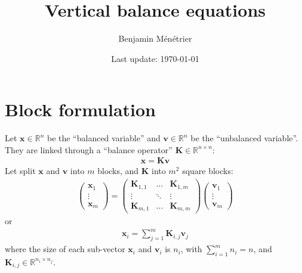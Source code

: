 \documentclass[12pt]{scrartcl}
\begin{document}
\title{Vertical balance equations}
\author{Benjamin Ménétrier}
\date{Last update: \today}

\thispagestyle{empty}

\maketitle

\tableofcontents

\clearpage

\section{Block formulation}
Let $\mathbf{x} \in \mathbb{R}^n$ be the ``balanced variable'' and $\mathbf{v} \in \mathbb{R}^n$ be the ``unbalanced variable''. They are linked through a ``balance operator'' $\mathbf{K} \in \mathbb{R}^{n \times n}$:
\begin{align}
\mathbf{x} = \mathbf{K} \mathbf{v}
\end{align}
Let split $\mathbf{x}$ and $\mathbf{v}$ into $m$ blocks, and $\mathbf{K}$ into $m^2$ square blocks:
\begin{align}
\left(\begin{array}{c}
\mathbf{x}_1 \\
\vdots \\
\mathbf{x}_m
\end{array} \right) = \left(\begin{array}{ccc}
\mathbf{K}_{1,1} & \dots & \mathbf{K}_{1,m} \\
\vdots & \ddots & \vdots \\
\mathbf{K}_{m,1} & \dots & \mathbf{K}_{m,m} 
\end{array} \right) \left(\begin{array}{c}
\mathbf{v}_1 \\
\vdots \\
\mathbf{v}_m
\end{array} \right)
\end{align}
or
\begin{align}
\label{eq:full}
\mathbf{x}_i = \sum_{j=1}^m \mathbf{K}_{i,j} \mathbf{v}_j
\end{align}
where the size of each sub-vector $\mathbf{x}_i$ and $\mathbf{v}_i$ is $n_i$, with $\displaystyle \sum_{i=1}^m n_i = n$, and $\mathbf{K}_{i,j} \in \mathbb{R}^{n_i \times n_j}$.
\end{document}
